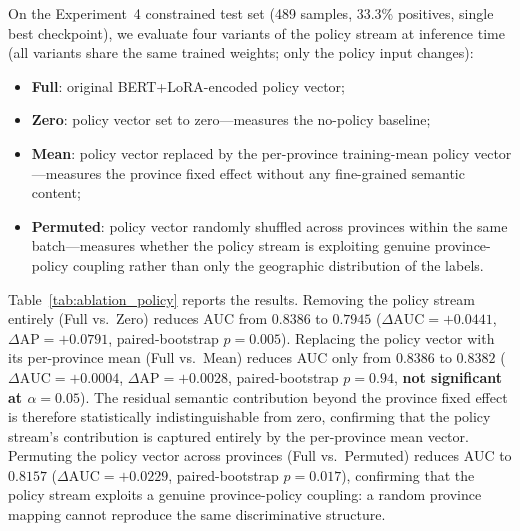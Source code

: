 \documentclass[12pt, a4paper]{article}
\begin{document}
On the Experiment~4 constrained test set (489 samples,
33.3\% positives, single best checkpoint), we evaluate four
variants of the policy stream at inference time (all
variants share the same trained weights; only the policy
input changes):

\begin{itemize}
  \item \textbf{Full}: original BERT+LoRA-encoded policy vector;
  \item \textbf{Zero}: policy vector set to zero---measures
        the no-policy baseline;
  \item \textbf{Mean}: policy vector replaced by the
        per-province training-mean policy vector---measures
        the province fixed effect without any fine-grained
        semantic content;
  \item \textbf{Permuted}: policy vector randomly shuffled
        across provinces within the same batch---measures
        whether the policy stream is exploiting genuine
        province-policy coupling rather than only the
        geographic distribution of the labels.
\end{itemize}

Table~\ref{tab:ablation_policy} reports the results.
Removing the policy stream entirely (Full vs.\ Zero) reduces
AUC from $0.8386$ to $0.7945$
($\Delta\text{AUC}=+0.0441$,
$\Delta\text{AP}=+0.0791$, paired-bootstrap
$p=0.005$). Replacing the policy vector with its
per-province mean (Full vs.\ Mean) reduces AUC only from
$0.8386$ to $0.8382$
($\Delta\text{AUC}=+0.0004$,
$\Delta\text{AP}=+0.0028$, paired-bootstrap $p=0.94$,
\textbf{not significant at $\alpha=0.05$}). The residual
semantic contribution beyond the province fixed effect is
therefore statistically indistinguishable from zero,
confirming that the policy stream's contribution is captured
entirely by the per-province mean vector. Permuting the policy
vector across provinces (Full vs.\ Permuted) reduces AUC to
$0.8157$ ($\Delta\text{AUC}=+0.0229$, paired-bootstrap
$p=0.017$), confirming that the policy stream exploits a
genuine province-policy coupling: a random province mapping
cannot reproduce the same discriminative structure.
\end{document}
